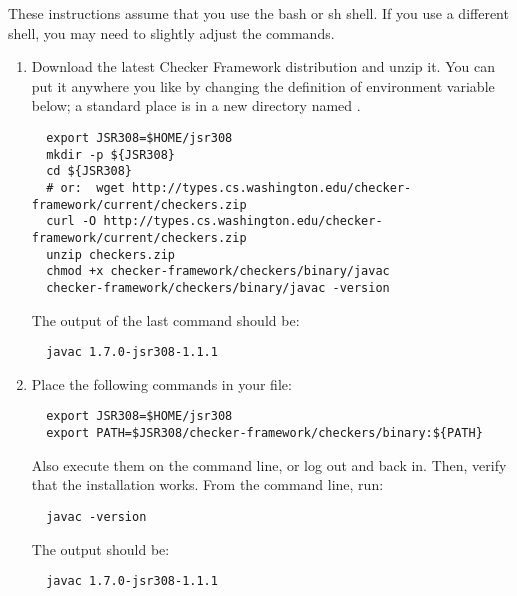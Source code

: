These instructions assume that you use the bash or sh shell.  If you use a
different shell, you may need to slightly adjust the commands.

\begin{enumerate}

\item
  Download the latest Checker Framework distribution
  and unzip it.  You can put it anywhere you like by changing the
  definition of environment variable  below; a standard place
  is in a
  new directory named .

\begin{Verbatim}
  export JSR308=$HOME/jsr308
  mkdir -p ${JSR308}
  cd ${JSR308}
  # or:  wget http://types.cs.washington.edu/checker-framework/current/checkers.zip
  curl -O http://types.cs.washington.edu/checker-framework/current/checkers.zip
  unzip checkers.zip
  chmod +x checker-framework/checkers/binary/javac
  checker-framework/checkers/binary/javac -version
\end{Verbatim}

The output of the last command should be:

\begin{Verbatim}
  javac 1.7.0-jsr308-1.1.1
\end{Verbatim}


\item
  Place the following commands in your  file:
\begin{Verbatim}
  export JSR308=$HOME/jsr308
  export PATH=$JSR308/checker-framework/checkers/binary:${PATH}
\end{Verbatim}


Also execute them on the command line, or log out and back in.  Then,
verify that the installation works.  From the command line, run:

\begin{Verbatim}
  javac -version
\end{Verbatim}

The output should be:

\begin{Verbatim}
  javac 1.7.0-jsr308-1.1.1
\end{Verbatim}

\end{enumerate}

